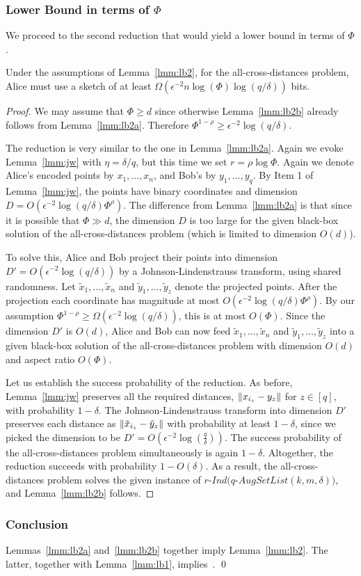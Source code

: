 \subsubsection{Lower Bound in terms of $\Phi$}
We proceed to the second reduction that would yield a lower bound in terms of $\Phi$.
\begin{lemma}\label{lmm:lb2b}
Under the assumptions of Lemma~\ref{lmm:lb2}, for the all-cross-distances problem, Alice must use a sketch of at least $\Omega(\epsilon^{-2}n\log(\Phi)\log(q/\delta))$ bits.
\end{lemma}
\begin{proof}
We may assume that $\Phi\geq d$ since otherwise Lemma~\ref{lmm:lb2b} already follows from Lemma~\ref{lmm:lb2a}. Therefore $\Phi^{1-\rho}\geq\epsilon^{-2}\log(q/\delta)$.

The reduction is very similar to the one in Lemma~\ref{lmm:lb2a}.
Again we evoke Lemma~\ref{lmm:jw} with $\eta=\delta/q$, but this time we set $r=\rho\log\Phi$.
Again we denote Alice's encoded points by $x_1,\ldots ,x_n$, and Bob's by $y_1,\ldots,y_q$.
By Item 1 of Lemma~\ref{lmm:jw}, the points have binary coordinates and dimension $D=O(\epsilon^{-2}\log(q/\delta)\Phi^\rho)$. The difference from Lemma~\ref{lmm:lb2a} is that since it is possible that $\Phi\gg d$, the dimension $D$ is too large for the given black-box solution of the all-cross-distances problem (which is limited to dimension $O(d)$).

To solve this, Alice and Bob project their points into dimension $D'=O(\epsilon^{-2}\log(q/\delta))$ by a Johnson-Lindenstrauss transform, using shared randomness.
Let $\tilde x_1,\ldots,\tilde x_n$ and $\tilde y_1,\ldots,\tilde y_z$ denote the projected points.
After the projection each coordinate has magnitude at most $O(\epsilon^{-2}\log(q/\delta)\Phi^\rho)$.
By our assumption $\Phi^{1-\rho}\geq\Omega(\epsilon^{-2}\log(q/\delta))$, this is at most $O(\Phi)$.
Since the dimension $D'$ is $O(d)$, Alice and Bob can now feed $\tilde x_1,\ldots,\tilde x_n$ and $\tilde y_1,\ldots,\tilde y_z$ into a given black-box solution of the all-cross-distances problem with dimension $O(d)$ and aspect ratio $O(\Phi)$.

Let us establish the success probability of the reduction.
As before, Lemma~\ref{lmm:jw} preserves all the required distances, $\lVert x_{i_z}-y_z\rVert$ for $z\in[q]$, with probability $1-\delta$.
The Johnson-Lindenstrauss transform into dimension $D'$ preserves each distance as $\lVert\tilde x_{i_z}-\tilde y_z\rVert$ with probability at least $1-\delta$, since we picked the dimension to be $D'=O(\epsilon^{-2}\log(\frac{q}{\delta}))$.
The success probability of the all-cross-distances problem simultaneously is again $1-\delta$. Altogether, the reduction succeeds with probability $1-O(\delta)$. As a result, the all-cross-distances problem solves the given instance of  $r$-$Ind(q$-$AugSetList(k,m,\delta))$, and Lemma~\ref{lmm:lb2b} follows.
\end{proof}

\subsubsection{Conclusion}
Lemmas~\ref{lmm:lb2a} and~\ref{lmm:lb2b} together imply Lemma~\ref{lmm:lb2}.
The latter, together with Lemma~\ref{lmm:lb1}, implies~. \qed
